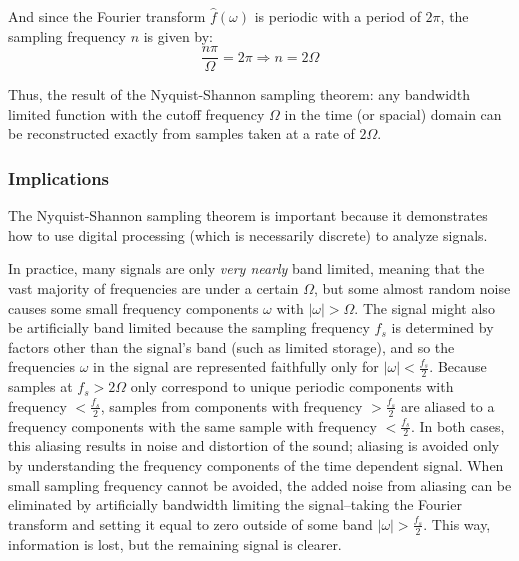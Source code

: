 \documentclass[12pt]{article}
\newcommand{\inftyint}{\int_{-\infty}^{\infty}}
\begin{document}
And since the Fourier transform \( \hat{f}(\omega) \) is periodic with a period of \( 2\pi\), the sampling frequency \( n\) is given by:
\[ \frac{n\pi}{\Omega} = 2\pi \Rightarrow n = 2\Omega\]

Thus, the result of the Nyquist-Shannon sampling theorem: any bandwidth limited function with the cutoff frequency \( \Omega \) in the time (or spacial) domain can be reconstructed exactly from samples taken at a rate of \( 2\Omega \).

%
%


\subsubsection{Implications}

The Nyquist-Shannon sampling theorem is important because it demonstrates how to use digital processing (which is necessarily discrete) to analyze signals. 

In practice, many signals are only \emph{very nearly} band limited, meaning that the vast majority of frequencies are under a certain \( \Omega \), but some almost random noise causes some small frequency components \( \omega \) with \( |\omega| > \Omega \). The signal might also be artificially band limited because the sampling frequency \( f_s\) is determined by factors other than the signal's band (such as limited storage), and so the frequencies \( \omega \) in the signal are represented faithfully only for \(|\omega| < \frac{f_s}{2} \). Because samples at \( f_s > 2\Omega \) only correspond to unique periodic components with frequency \( < \frac{f_s}{2} \), samples from components with frequency \( > \frac{f_s}{2} \) are aliased to a frequency components with the same sample with frequency \( < \frac{f_s}{2} \). In both cases, this aliasing results in noise and distortion of the sound; aliasing is avoided only by understanding the frequency components of the time dependent signal. When small sampling frequency cannot be avoided, the added noise from aliasing can be eliminated by artificially bandwidth limiting the signal--taking the Fourier transform and setting it equal to zero outside of some band \( |\omega| > \frac{f_s}{2}  \). This way, information is lost, but the remaining signal is clearer. 
\end{document}
